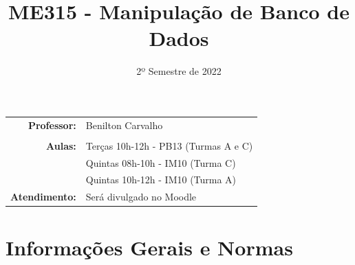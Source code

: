 \documentclass[paper=letter, fontsize=12pt]{scrartcl} %
\title{\normalfont \LARGE ME315 - Manipulação de Banco de Dados}
\subtitle{2º Semestre de 2022}
\author{}
\date{}
\begin{document}
\maketitle

\vspace{-1.5cm}

\noindent
\begin{tabular}{rl}
\textbf{Professor:} & 	 Benilton Carvalho \\
\\
\textbf{Aulas:} & Terças 10h-12h - PB13 (Turmas A e C)\\
                & Quintas 08h-10h - IM10 (Turma C) \\
                & Quintas 10h-12h - IM10 (Turma A) \\
\textbf{Atendimento:} & Será divulgado no Moodle\\



\end{tabular}

\section{Informações Gerais e Normas}
\end{document}
